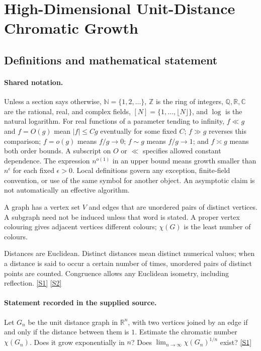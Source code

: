 \documentclass[11pt,a4paper]{article}
\newcommand{\N}{\mathbb{N}}
\newcommand{\Z}{\mathbb{Z}}
\newcommand{\Q}{\mathbb{Q}}
\newcommand{\R}{\mathbb{R}}
\newcommand{\C}{\mathbb{C}}
\newcommand{\sref}[2]{\hyperlink{source:#1:#2}{[S#2]}}
\begin{document}
\section{High-Dimensional Unit-Distance Chromatic Growth}\label{statement}


\subsection{Definitions and mathematical statement}

\paragraph{Shared notation.}Unless a section says otherwise, $\N=\{1,2,\ldots\}$,
$\Z$ is the ring of integers, $\Q,\R,\C$ are the rational, real, and complex
fields, $[N]=\{1,\ldots,\lfloor N\rfloor\}$, and $\log$ is the natural
logarithm. For real functions of a parameter tending to infinity,
$f\ll g$ and $f=O(g)$ mean $|f|\leq Cg$ eventually for some fixed $C$;
$f\gg g$ reverses this comparison; $f=o(g)$ means $f/g\to0$;
$f\sim g$ means $f/g\to1$; and $f\asymp g$ means both order bounds.
A subscript on $O$ or $\ll$ specifies allowed constant dependence.
The expression $n^{o(1)}$ in an upper bound means growth smaller than
$n^\epsilon$ for each fixed $\epsilon>0$. Local definitions govern any
exception, finite-field convention, or use of the same symbol for another
object. An asymptotic claim is not automatically an effective algorithm.



A graph has a vertex set $V$ and edges that are unordered pairs of distinct vertices. A subgraph need not be induced unless that word is stated. A proper vertex colouring gives adjacent vertices different colours; $\chi(G)$ is the least number of colours.

Distances are Euclidean. Distinct distances mean distinct numerical values; when a distance is said to occur a certain number of times, unordered pairs of distinct points are counted. Congruence allows any Euclidean isometry, including reflection. \sref{statement}{1} \sref{statement}{2}

\paragraph{Statement recorded in the supplied source.}
Let $G_n$ be the unit distance graph in $\mathbb{R}^n$, with two vertices joined by an edge if and only if the distance between them is $1$.
Estimate the chromatic number $\chi(G_n)$. Does it grow exponentially in $n$? Does $ \lim_{n\to \infty}\chi(G_n)^{1/n} $ exist? \sref{statement}{1}
\end{document}
